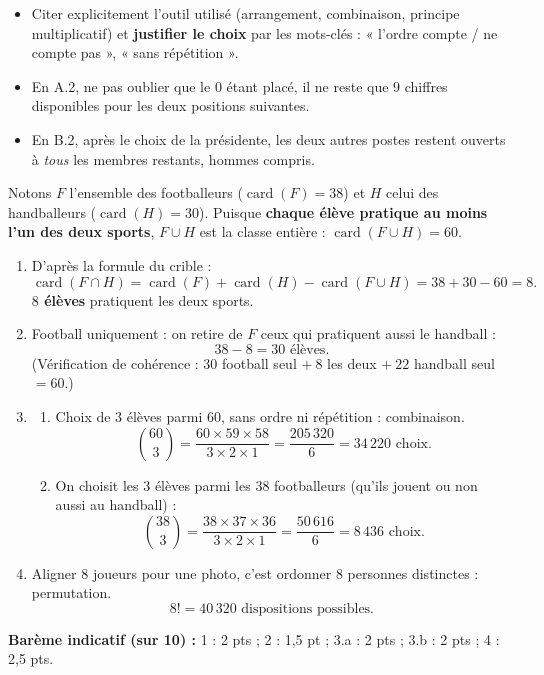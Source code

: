\documentclass[11pt]{article}
\begin{document}
\begin{attention}
\begin{itemize}
\item Citer explicitement l'outil utilisé (arrangement, combinaison, principe multiplicatif) et \textbf{justifier le choix} par les mots-clés : « l'ordre compte / ne compte pas », « sans répétition ».
\item En A.2, ne pas oublier que le $0$ étant placé, il ne reste que $9$ chiffres disponibles pour les deux positions suivantes.
\item En B.2, après le choix de la présidente, les deux autres postes restent ouverts à \emph{tous} les membres restants, hommes compris.
\end{itemize}
\end{attention}

\begin{corrige}
Notons $F$ l'ensemble des footballeurs ($\operatorname{card}(F)=38$) et $H$ celui des handballeurs ($\operatorname{card}(H)=30$). Puisque \textbf{chaque élève pratique au moins l'un des deux sports}, $F\cup H$ est la classe entière : $\operatorname{card}(F\cup H)=60$.
\begin{enumerate}
\item D'après la formule du crible :
\[ \operatorname{card}(F\cap H)=\operatorname{card}(F)+\operatorname{card}(H)-\operatorname{card}(F\cup H)=38+30-60=8. \]
\textbf{$8$ élèves} pratiquent les deux sports.
\item Football uniquement : on retire de $F$ ceux qui pratiquent aussi le handball :
\[ 38-8=30 \text{ élèves.} \]
(Vérification de cohérence : $30$ football seul $+\ 8$ les deux $+\ 22$ handball seul $=60$.)
\item \begin{enumerate}
\item Choix de $3$ élèves parmi $60$, sans ordre ni répétition : combinaison.
\[ \binom{60}{3}=\frac{60\times59\times58}{3\times2\times1}=\frac{205\,320}{6}=34\,220 \text{ choix.} \]
\item On choisit les $3$ élèves parmi les $38$ footballeurs (qu'ils jouent ou non aussi au handball) :
\[ \binom{38}{3}=\frac{38\times37\times36}{3\times2\times1}=\frac{50\,616}{6}=8\,436 \text{ choix.} \]
\end{enumerate}
\item Aligner $8$ joueurs pour une photo, c'est ordonner $8$ personnes distinctes : permutation.
\[ 8!=40\,320 \text{ dispositions possibles.} \]
\end{enumerate}
\textbf{Barème indicatif (sur 10) :} 1 : 2 pts ; 2 : 1,5 pt ; 3.a : 2 pts ; 3.b : 2 pts ; 4 : 2,5 pts.
\end{corrige}
\end{document}
